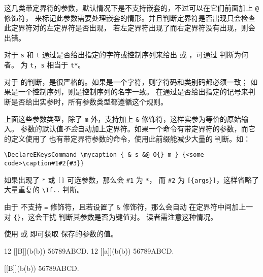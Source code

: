 \documentclass[openany]{book}
\begin{document}
这几类带定界符的参数，默认情况下是不支持嵌套的，不过可以在它们前面加上 \texttt @ 修饰符，
来标记此参数需要处理嵌套的情形。并且判断定界符是否出现只会检查此定界符对的左定界符是否出现，
若左定界符出现了而右定界符没有出现，则会出错。

对于 \texttt s 和 \texttt t 通过是否给出指定的字符或控制序列来给出 
或 ，可通过  判断为何者。
 为 \verb|t|，\texttt s 相当于 \verb|t*|。

对于  的判断，是很严格的。如果是一个字符，则字符码和类别码都必须一致；
如果是一个控制序列，则是控制序列的名字一致。
在通过是否给出指定的记号来判断是否给出实参时，所有参数类型都遵循这个规则。

上面这些参数类型，除了 \texttt m 外，支持加上 \texttt\& 修饰符，这样实参为等价的原始输入。
参数的默认值\emph{不会}自动加上定界符。如果一个命令有带定界符的参数，而它的定义使用了
也有带定界符参数的命令，使用此前缀能减少大量的  判断。如：
\begin{Verbatim}
\DeclareEKeysCommand \mycaption { & s &@ O{} m } {<some code>\caption#1#2{#3}}
\end{Verbatim}
如果出现了 \verb|*| 或 \verb|[]| 可选参数，那么会 \verb|#1| 为 \verb|*|，
而 \verb|#2| 为 \verb|[{args}]|，这样省略了大量重复的 \verb|\If..| 判断。

由于  不支持 \texttt= 修饰符，且若设置了 \texttt\& 修饰符，那么会自动
在定界符中间加上一对 \verb|{}|，这会干扰  判断其参数是否为键值对。
读者需注意这种情况。


使用  或  即可获取  
保存的参数的值。

\begin{examcode}{}
\DeclareEKeysCollector {}
\faa{} 12 [[B]](b(b)) 56789ABCD.
\faa{} %
  12 [[a]](b(b)) 56789ABCD.

\DeclareEKeysCollector*{} 
 [[B]](b(b)) 56789ABCD.
\end{examcode}
\end{document}
